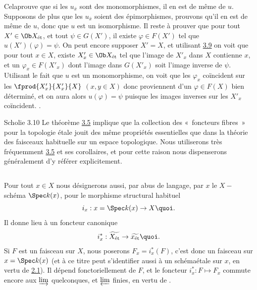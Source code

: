 \documentclass[10pt]{../fichiers-configuration-latex/smfart}
\begin{document}
Cela\pageoriginale prouve que si les $u_{\bar{x}}$ sont des
monomorphismes, il en
est de même de $u$. Supposons de plus que les $u_{\bar{x}}$ soient des
épimorphismes, prouvons qu'il en est de même de $u$, donc que $u$ est
un isomorphisme. Il reste à prouver que pour tout $X'\in \Ob X_{\text{ét}}$,
et tout $\psi \in G (X')$, il existe $\varphi \in F(X')$ tel que
$u(X') (\varphi) = \psi$. On peut encore supposer $X'= X$, et
utilisant \hyperref[VIII.prop3.9]{3.9} %
on voit que pour tout $x \in X$,  existe $X'_x \in \Ob
X_{\text{ét}}$ tel que l'image de $X'_x$ dans $X$ contienne $x$, et un
$\varphi_x \in F(X'_x)$ dont l'image dans $G (X'_x)$ soit
l'image inverse de $\psi$. Utilisant le fait que $u$ est un
monomorphisme, on voit que les $\varphi_{x}$ coïncident sur les
$\fprod{X'_x}{X'_x}{X}$ $(x, y \in X)$  donc proviennent d'un
$\varphi \in F (X)$ bien déterminé, et on aura alors $u(\varphi) =
\psi$ puisque les images inverses sur les $X'_{x}$
coïncident. \cqfd.

\begin{enonce*}[remark]{Scholie 3.10}
Le théorème \hyperref[VIII.thm3.5]{3.5} implique que la collection des
« foncteurs fibres »
pour la topologie étale jouit des même propriétés essentielles que
dans la théorie des faisceaux habituelle sur un espace
topologique. Nous utiliserons très fréquemment \hyperref[VIII.thm3.5]{3.5}
et ses corollaires,
et pour cette raison nous  dispenserons généralement d'y référer explicitement.
\end{enonce*}

\setcounter{subsection}{10}
\subsection{}

Pour tout $x \in X$ nous désignerons aussi, par abus de langage, par
$x$ le $X-$ schéma $\Spec k(x)$, pour le morphisme structural habituel
$$
i_x : x = \Spec k(x) \to X{\quoi}.
$$
Il donne lieu à un foncteur canonique
$$
i_x^{\ast} : \widetilde{X_{\text{ét}}} \to \widetilde{x_{\text{ét}}}{\quoi}.
$$
Si $F$ est un faisceau sur $X$, nous poserons $F_x = i^{\ast}_x
(F)$, c'est donc un faisceau sur $x = \Spec k(x)$ (et à ce titre
peut s'identifier aussi à un schéma\pageoriginale étale sur $x$, en
vertu de \hyperref[VIII.prop2.1]{2.1}). Il dépend fonctoriellement de $F$, et
le foncteur $i^{\ast}_x : F \mapsto F_x$ commute encore aux
$\varinjlim$ quelconques, et $\varprojlim$ finies, en vertu de
.
\end{document}
